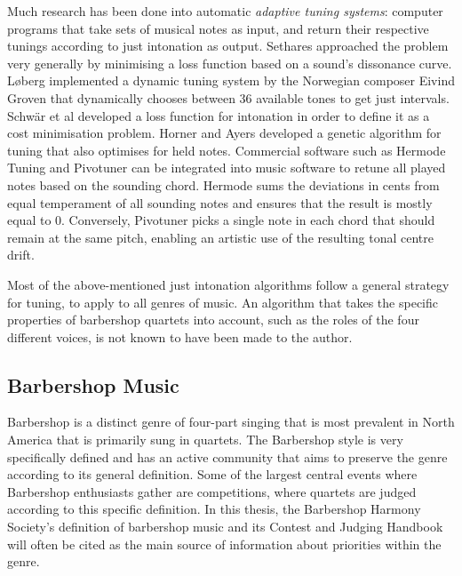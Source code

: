\documentclass[a4paper]{article}
\begin{document}
Much research has been done into automatic \textit{adaptive tuning systems}: computer programs that take sets of musical notes as input, and return their respective tunings according to just intonation as output. \cite{sethares_adaptive_2005} Sethares \cite{sethares_adaptive_1994} approached the problem very generally by minimising a loss function based on a sound's dissonance curve. Løberg \cite{code_grovenmax_2002} implemented a dynamic tuning system by the Norwegian composer Eivind Groven that dynamically chooses between 36 available tones to get just intervals. Schwär et al \cite{schwar_differentiable_2021} developed a loss function for intonation in order to define it as a cost minimisation problem. Horner and Ayers \cite{horner_common_1996} developed a genetic algorithm for tuning that also optimises for held notes. Commercial software such as Hermode Tuning \cite{mohrlok_hermode_2003} and Pivotuner \cite{volkov_pivotuner_2022} can be integrated into music software to retune all played notes based on the sounding chord. Hermode sums the deviations in cents from equal temperament of all sounding notes and ensures that the result is mostly equal to 0. \cite{mohrlok_hermode_2003} Conversely, Pivotuner picks a single note in each chord that should remain at the same pitch, enabling an artistic use of the resulting tonal centre drift. \cite{volkov_pivotuner_2022}

Most of the above-mentioned just intonation algorithms follow a general strategy for tuning, to apply to all genres of music. An algorithm that takes the specific properties of barbershop quartets into account, such as the roles of the four different voices, is not known to have been made to the author.

\subsection{Barbershop Music}
\label{intro_bs}
Barbershop is a distinct genre of four-part singing that is most prevalent in North America that is primarily sung in quartets. \cite{garnett_ethics_1999} The Barbershop style is very specifically defined and has an active community that aims to preserve the genre according to its general definition. Some of the largest central events where Barbershop enthusiasts gather are competitions, where quartets are judged according to this specific definition. In this thesis, the Barbershop Harmony Society's definition of barbershop music and its Contest and Judging Handbook \cite{barbershop_harmony_society_contest_2022} will often be cited as the main source of information about priorities within the genre.
\end{document}
